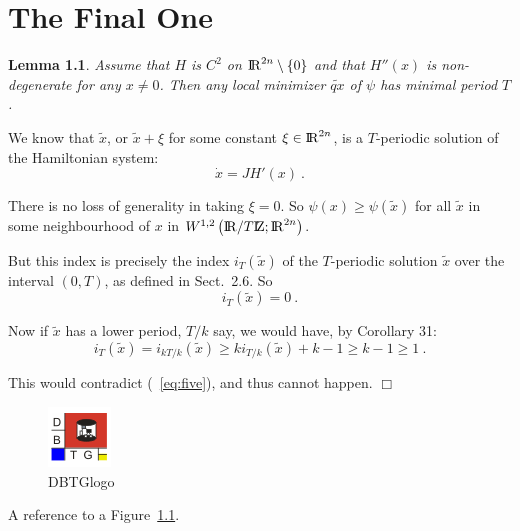 \documentclass[abstracton,12pt]{scrreprt}
\newtheorem{lemma}{Lemma}
\newenvironment{proof}
  {\noindent{\bf Proof:\rm}}{\hfill$\Box$\vspace{\medskipamount}}
\def\bbbr{{\rm I\!R}}
\def\bbbz{{\rm I\!Z}}
\begin{document}
\chapter{The Final One}

\begin{lemma}
Assume that $H$ is $C^{2}$ on $\bbbr^{2n} \setminus \{ 0\}$ and
that $H'' (x)$ is non-de\-gen\-er\-ate for any $x\ne 0$. Then any local
minimizer $\widetilde{qx}$ of $\psi$ has minimal period $T$.
\end{lemma}

\begin{proof}
We know that $\widetilde{x}$, or
$\widetilde{x} + \xi$ for some constant $\xi
\in \bbbr^{2n}$, is a $T$-periodic solution of the Hamiltonian system:
\begin{equation}
  \dot{x} = JH' (x)\ .
\end{equation}

There is no loss of generality in taking $\xi = 0$. So
$\psi (x) \ge \psi (\widetilde{x} )$
for all $\widetilde{x}$ in some neighbourhood of $x$ in
$W^{1,2} \left(\bbbr / T\bbbz ; \bbbr^{2n}\right)$.

But this index is precisely the index
$i_{T} (\widetilde{x} )$ of the $T$-periodic
solution $\widetilde{x}$ over the interval
$(0,T)$, as defined in Sect.~2.6. So
\begin{equation}
  i_{T} (\widetilde{x} ) = 0\ .
  \label{eq:five}
\end{equation}

Now if $\widetilde{x}$ has a lower period, $T/k$ say,
we would have, by Corollary 31:
\begin{equation}
  i_{T} (\widetilde{x} ) =
  i_{kT/k}(\widetilde{x} ) \ge
  ki_{T/k} (\widetilde{x} ) + k-1 \ge k-1 \ge 1\ .
\end{equation}

This would contradict (~\ref{eq:five}), and thus cannot happen.
\end{proof}

\begin{figure}[htbp]\centering
  \includegraphics{dbtgBW}
  \caption{DBTGlogo}
  \label{fig:dbtglogo}
\end{figure}

A reference to a Figure~\ref{fig:dbtglogo}.



\end{document}
